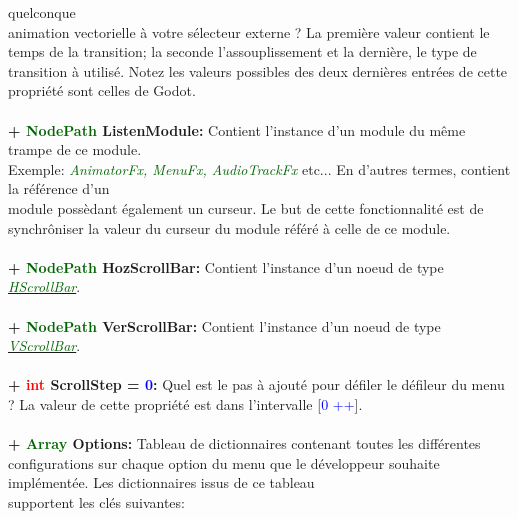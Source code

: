 \documentclass[a4paper, 11pt]{article}
\begin{document}
	quelconque \\animation vectorielle à votre sélecteur externe ? La première valeur contient le temps de 
	la transition; la seconde l'assouplissement et la dernière, le type de transition à utilisé. Notez les 
	valeurs possibles des deux dernières entrées de cette propriété sont celles de Godot.\\\\
	\textbf{+ \textcolor{darkgreen}{NodePath} ListenModule:} Contient l'instance d'un module du même trampe
	de ce module. \\Exemple: \textit{\textcolor{darkgreen}{AnimatorFx, MenuFx, AudioTrackFx}} etc... En
	d'autres termes, contient la référence d'un \\module possèdant également un curseur. Le but de cette
	fonctionnalité est de synchrôniser la valeur du curseur du module référé à celle de ce module.\\\\
	\textbf{+ \textcolor{darkgreen}{NodePath} HozScrollBar:} Contient l'instance d'un noeud de type
	\href{https://docs.godotengine.org/fr/stable/classes/class_hscrollbar.html}
	{\textit{\textcolor{darkgreen}{HScrollBar}}}.\\\\
	\textbf{+ \textcolor{darkgreen}{NodePath} VerScrollBar:} Contient l'instance d'un noeud de type
	\href{https://docs.godotengine.org/fr/stable/classes/class_vscrollbar.html}
	{\textit{\textcolor{darkgreen}{VScrollBar}}}.\\\\
	\newpage \textbf{+ \textcolor{red}{int} ScrollStep = \textcolor{blue}{0}:} Quel est le pas à ajouté pour 
	défiler le défileur du menu ? La valeur de cette propriété est dans l'intervalle [\textcolor{blue}{0}
	\textcolor{blue}{++}].\\\\
	\textbf{+ \textcolor{darkgreen}{Array} Options:} Tableau de dictionnaires contenant toutes les 
	différentes configurations sur chaque option du menu que le développeur souhaite implémentée. Les 
	dictionnaires issus de ce tableau \\supportent les clés suivantes:\\
\end{document}
